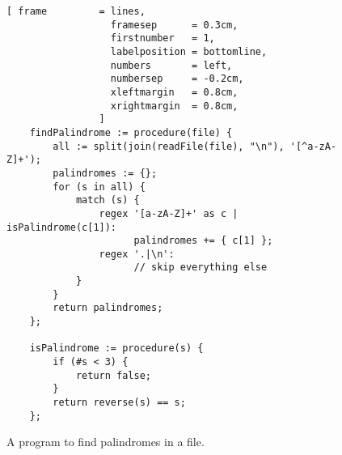 \begin{figure}[!ht]
\centering
\begin{Verbatim}[ frame         = lines, 
                  framesep      = 0.3cm, 
                  firstnumber   = 1,
                  labelposition = bottomline,
                  numbers       = left,
                  numbersep     = -0.2cm,
                  xleftmargin   = 0.8cm,
                  xrightmargin  = 0.8cm,
                ]
    findPalindrome := procedure(file) {
        all := split(join(readFile(file), "\n"), '[^a-zA-Z]+');
        palindromes := {};
        for (s in all) {
            match (s) {
                regex '[a-zA-Z]+' as c | isPalindrome(c[1]): 
                      palindromes += { c[1] };
                regex '.|\n': 
                      // skip everything else
            }
        }
        return palindromes;        
    };
    
    isPalindrome := procedure(s) {
        if (#s < 3) {
            return false;
        }
        return reverse(s) == s;
    };
\end{Verbatim}
\vspace*{-0.3cm}
\caption{A program to find palindromes in a file.}
\label{fig:find-palindrome.stlx}
\end{figure}


